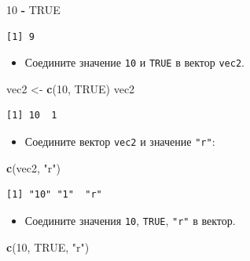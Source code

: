 \documentclass[
]{book}
\newenvironment{Shaded}{\begin{snugshade}}{\end{snugshade}}
\newcommand{\DecValTok}[1]{\textcolor[rgb]{0.00,0.00,0.81}{#1}}
\newcommand{\KeywordTok}[1]{\textcolor[rgb]{0.13,0.29,0.53}{\textbf{#1}}}
\newcommand{\NormalTok}[1]{#1}
\newcommand{\OperatorTok}[1]{\textcolor[rgb]{0.81,0.36,0.00}{\textbf{#1}}}
\newcommand{\OtherTok}[1]{\textcolor[rgb]{0.56,0.35,0.01}{#1}}
\newcommand{\StringTok}[1]{\textcolor[rgb]{0.31,0.60,0.02}{#1}}
\providecommand{\tightlist}{%
  \setlength{\itemsep}{0pt}\setlength{\parskip}{0pt}}
\begin{document}
\begin{Shaded}
\begin{Highlighting}[]
\DecValTok{10} \OperatorTok{-}\StringTok{ }\OtherTok{TRUE}
\end{Highlighting}
\end{Shaded}

\begin{verbatim}
[1] 9
\end{verbatim}

\begin{itemize}
\tightlist
\item
  Соедините значение \texttt{10} и \texttt{TRUE} в вектор \texttt{vec2}.
\end{itemize}

\begin{Shaded}
\begin{Highlighting}[]
\NormalTok{vec2 <-}\StringTok{ }\KeywordTok{c}\NormalTok{(}\DecValTok{10}\NormalTok{, }\OtherTok{TRUE}\NormalTok{)}
\NormalTok{vec2}
\end{Highlighting}
\end{Shaded}

\begin{verbatim}
[1] 10  1
\end{verbatim}

\begin{itemize}
\tightlist
\item
  Соедините вектор \texttt{vec2} и значение \texttt{"r"}:
\end{itemize}

\begin{Shaded}
\begin{Highlighting}[]
\KeywordTok{c}\NormalTok{(vec2, }\StringTok{"r"}\NormalTok{)}
\end{Highlighting}
\end{Shaded}

\begin{verbatim}
[1] "10" "1"  "r" 
\end{verbatim}

\begin{itemize}
\tightlist
\item
  Соедините значения \texttt{10}, \texttt{TRUE}, \texttt{"r"} в вектор.
\end{itemize}

\begin{Shaded}
\begin{Highlighting}[]
\KeywordTok{c}\NormalTok{(}\DecValTok{10}\NormalTok{, }\OtherTok{TRUE}\NormalTok{, }\StringTok{"r"}\NormalTok{)}
\end{Highlighting}
\end{Shaded}
\end{document}
